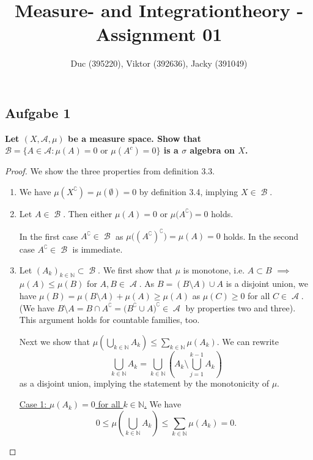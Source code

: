 \documentclass{article}
\title{Measure- and Integrationtheory - Assignment 01}
\author{Duc (395220), Viktor (392636), Jacky (391049)}
\DeclareMathOperator{\A}{\mathcal{A}}
\DeclareMathOperator{\B}{\mathcal{B}}
\renewcommand{\c}{\complement}
\newcommand{\N}{\mathbb{N}} %
\begin{document}
\maketitle

\subsection*{Aufgabe 1}
\textbf{Let $(X, \mathcal A, \mu)$ be a measure space.
Show that $\mathcal{B} = \big\{ A \in \mathcal A: \mu(A) = 0 \text{ or } \mu(A^{c}) = 0\big\}$ is a $\sigma$ algebra on $X$.}

\begin{proof}
    We show the three properties from definition 3.3.
    \begin{enumerate}[label = (\roman*)]
        \item 
        We have $\mu(X^{\c}) = \mu(\emptyset) = 0$ by definition 3.4, implying $X \in \B$.
        
        \item
        Let $A \in \B$.
        Then either $\mu(A) = 0$ or $\mu\big(A^{\c}\big) = 0$ holds.
        
        In the first case $A^{\c} \in \B$ as $\mu\big((A^{\c})^{\c}\big) = \mu(A) = 0$ holds.
        In the second case $A^{\c} \in \B$ is immediate.
        
        \item
        Let $(A_k)_{k \in \N} \subset \B$.
        We first show that $\mu$ is monotone, i.e. $A \subset B$ $\implies$ $\mu(A) \le \mu(B)$ for $A,B \in \A$.
        As $B = (B \setminus A) \cup A$ is a disjoint union, we have $\mu(B) = \mu(B \setminus A) + \mu(A) \ge \mu(A)$ as $\mu(C) \ge 0$ for all $C \in \A$.
        (We have $B \setminus A= B \cap A^{\c} = \big(B^{\c} \cup A\big)^{\c} \in \A$ by properties two and three).
        This argument holds for countable families, too.
        
        Next we show that $\mu\left(\bigcup_{k \in \N} A_k\right) \le \sum_{k \in \N}\mu(A_k)$.
        We can rewrite
        \begin{equation*}
            \bigcup_{k \in \N} A_k
            = \bigcup_{k \in \N} \left(A_k \setminus \bigcup_{j = 1}^{k - 1} A_k\right)    
        \end{equation*}
        as a disjoint union, implying the statement by the monotonicity of $\mu$.
        
        \underline{Case 1: $\mu(A_k) = 0$ for all $k \in \N$.}
        We have
        \begin{equation*}
            0
            \le \mu\left(\bigcup_{k \in \N} A_k\right)
            \le \sum_{k \in \N}\mu(A_k)
            = 0.
        \end{equation*}
        

\end{enumerate}
\end{proof}
\end{document}
